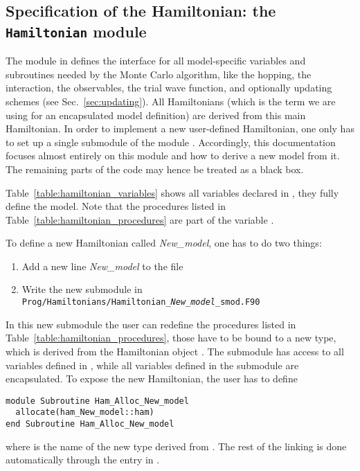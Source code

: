\subsection{Specification of the Hamiltonian: the \texttt{Hamiltonian} module} 
\label{sec:hamiltonian}



The module  in  defines the interface for all model-specific variables and subroutines needed by the Monte Carlo algorithm, like the hopping,  the interaction, the observables, the trial wave function, and optionally updating schemes (see Sec.~\ref{sec:updating}).
All Hamiltonians (which is the term we are using for an encapsulated model definition) are derived from this main Hamiltonian.
In order to implement a new user-defined Hamiltonian, one only has to set up a single submodule of the module . Accordingly, this documentation focuses almost entirely on this module and how to derive a new model from it.
The remaining parts of the code may hence be treated as a black box.

Table~\ref{table:hamiltonian_variables} shows all variables declared in , they fully define the model. Note that the procedures listed in Table~\ref{table:hamiltonian_procedures} are part of the variable .

To define a new Hamiltonian called \emph{New\_model}, one has to do two things:
\begin{enumerate}
\item Add a new line \emph{New\_model} to the file 
\item Write the new submodule in \texttt{Prog/Hamiltonians/Hamiltonian\_\emph{New\_model}\_smod.F90}
\end{enumerate}

In this new submodule the user can redefine the procedures listed in Table~\ref{table:hamiltonian_procedures}, those have to be bound to a new type, which is derived from the Hamiltonian object . The submodule has access to all variables defined in , while all variables defined in the submodule are encapsulated. To expose the new Hamiltonian, the user has to define 
\begin{lstlisting}[style=fortran]
module Subroutine Ham_Alloc_New_model
  allocate(ham_New_model::ham)
end Subroutine Ham_Alloc_New_model
\end{lstlisting}
where  is the name of the new type derived from . The rest of the linking is done automatically through the entry in .

